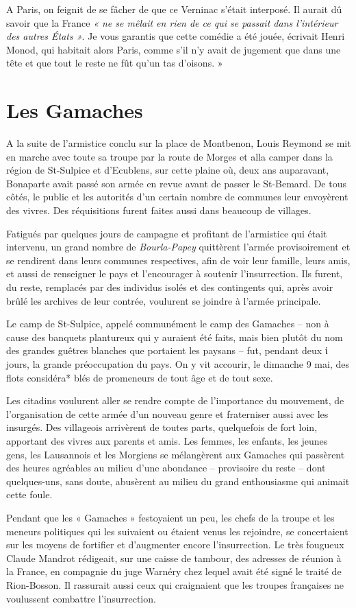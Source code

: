 \documentclass[french,twoside]{book} %
\begin{document}
\noindent A Paris, on feignit de se fâcher de que ce Verninac s’était interposé. Il aurait dû savoir que la France \emph{« ne se mêlait en rien de ce qui se passait dans l’intérieur des autres États »}. Je vous garantis que cette comédie a été jouée, écrivait Henri Monod, qui habitait alors Paris, comme s’il n’y avait de jugement que dans une tête et que tout le reste ne fût qu’un tas d’oisons. »
\section[Les Gamaches]{Les Gamaches}
\noindent A la suite de l’armistice conclu sur la place de Montbenon, Louis Reymond se mit en marche avec toute sa troupe par la route de Morges et alla camper dans la région de St-Sulpice et d’Ecublens, sur cette plaine où, deux ans auparavant, Bonaparte avait passé son armée en revue avant de passer le St-Bemard. De tous côtés, le public et les autorités d’un certain nombre de communes leur envoyèrent des vivres. Des réquisitions furent faites aussi dans beaucoup de villages.\par
Fatigués par quelques jours de campagne et profitant de l’armistice qui était intervenu, un grand nombre de \emph{Bourla-Papey} quittèrent l’armée provisoirement et se rendirent dans leurs communes respectives, afin de voir leur famille, leurs amis, et aussi de renseigner le pays et l’encourager à soutenir l’insurrection. Ils furent, du reste, remplacés par des individus isolés et des contingents qui, après avoir brûlé les archives de leur contrée, voulurent se joindre à l’armée principale.\par
Le camp de St-Sulpice, appelé communément le camp des Gamaches – non à cause des banquets plantureux qui y auraient été faits, mais bien plutôt du nom des grandes guêtres blanches que portaient les paysans – fut, pendant deux ί jours, la grande préoccupation du pays. On y vit accourir, le dimanche 9 mai, des flots considéra* blés de promeneurs de tout âge et de tout sexe.\par
Les citadins voulurent aller se rendre compte de l’importance du mouvement, de l’organisation de cette armée d’un nouveau genre et fraterniser aussi avec les insurgés. Des villageois arrivèrent de toutes parts, quelquefois de fort loin, apportant des vivres aux parents et amis. Les femmes, les enfants, les jeunes gens, les Lausannois et les Morgiens se mélangèrent aux Gamaches qui passèrent des heures agréables au milieu d’une abondance – provisoire du reste – dont quelques-uns, sans doute, abusèrent au milieu du grand enthousiasme qui animait cette foule.\par
Pendant que les « Gamaches » festoyaient un peu, les chefs de la troupe et les meneurs politiques qui les suivaient ou étaient venus les rejoindre, se concertaient sur les moyens de fortifier et d’augmenter encore l’insurrection. Le très fougueux Claude Mandrot rédigeait, sur une caisse de tambour, des adresses de réunion à la France, en compagnie du juge Warnéry chez lequel avait été signé le traité de Rion-Bosson. Il rassurait aussi ceux qui craignaient que les troupes françaises ne voulussent combattre l’insurrection.\par
\end{document}
